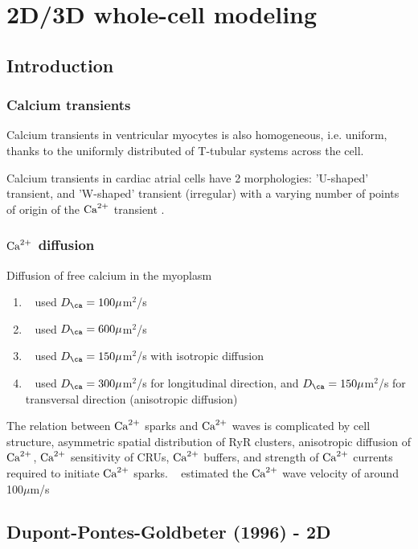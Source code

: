 
\chapter{2D/3D whole-cell modeling}
\label{chap:3d-whole-cell}

\section{Introduction}
\label{sec:introduction-16}

\subsection{Calcium transients}

Calcium transients in ventricular myocytes is also homogeneous, i.e. uniform,
thanks to the uniformly distributed of T-tubular systems across the cell. 

Calcium transients in cardiac atrial cells have 2 morphologies: 'U-shaped'
transient, and 'W-shaped' transient (irregular) with a varying number of points
of origin of the ${\text{Ca}^{2+}}$ transient \citep{kirk2003}.

\subsection{${\text{Ca}^{2+}}$ diffusion}
\label{sec:calcium-diffusion}

Diffusion of free calcium in the myoplasm 
\begin{enumerate}
\item ~\citep{langer1996} used $D_\ca = 100\mu$m$^2$/s
\item ~\citep{pratusevich1996} used $D_\ca=600\mu$m$^2$/s
\item ~\citep{izu2001,soeller2008} used $D_\ca=150\mu$m$^2$/s with isotropic
  diffusion 
\item ~\citep{li2007, li2009} used $D_\ca=300\mu$m$^2$/s for
  longitudinal direction, and $D_\ca=150\mu$m$^2$/s for transversal
  direction (anisotropic diffusion)
\end{enumerate}

The relation between ${\text{Ca}^{2+}}$ sparks and ${\text{Ca}^{2+}}$ waves is complicated by
cell structure, asymmetric spatial distribution of RyR clusters,
anisotropic diffusion of ${\text{Ca}^{2+}}$, ${\text{Ca}^{2+}}$ sensitivity of CRUs, ${\text{Ca}^{2+}}$
buffers, and strength of ${\text{Ca}^{2+}}$ currents required to initiate ${\text{Ca}^{2+}}$
sparks.  ~\citep{izu2001} estimated the ${\text{Ca}^{2+}}$ wave velocity of around
100$\mu$m/s

\section{Dupont-Pontes-Goldbeter (1996) - 2D}
\label{sec:dupont-pont-goldb}

